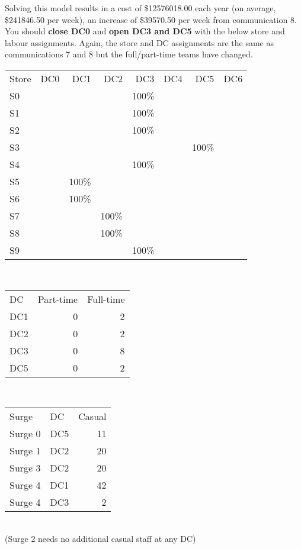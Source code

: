 \documentclass[11pt,a4paper]{article}
\begin{document}
Solving this model results in a cost of \$12576018.00 each year 
(on average, \$241846.50 per week), an increase of \$39570.50 
per week from communication 8.
You should \textbf{close DC0} and 
\textbf{open DC3 and DC5} 
with the below store and labour assignments. 
Again, the store and DC assignments are the same as communications 
7 and 8 but the full/part-time teams have changed.\\[0.8em]
\begin{tabular}{l  r  r  r  r r r r}
    Store & DC0 & DC1 & DC2 & DC3 & DC4 & DC5 & DC6 \\
    S0 &  &  &  & 100\% &  &  &  \\
    S1 &  &  &  & 100\% &  &  &  \\
    S2 &  &  &  & 100\% &  &  &  \\
    S3 &  &  &  &  &  & 100\% &  \\
    S4 &  &  &  & 100\% &  &  &  \\
    S5 &  & 100\% &  &  &  &  &  \\
    S6 &  & 100\% &  &  &  &  &  \\
    S7 &  &  & 100\% &  &  &  &  \\
    S8 &  &  & 100\% &  &  &  &  \\
    S9 &  &  &  & 100\% &  &  &  \\
\end{tabular} \\ [0.8em]
\begin{tabular}{l  r  r }
    DC & Part-time & Full-time \\
    DC1 & 0 &2 \\ 
    DC2  & 0 &2 \\ 
    DC3 &  0& 8 \\
    DC5 &  0&2 \\ 
\end{tabular} \\ [0.8em]
\begin{tabular}{l  l  r }
    Surge & DC & Casual \\
    Surge 0 &DC5& 11  \\ 
    Surge 1&DC2 & 20 \\ 
    Surge 3&DC2 & 20 \\
    Surge 4&DC1 & 42 \\ 
    Surge 4&DC3 & 2 \\ 
\end{tabular} \\ (Surge 2 needs no additional casual staff at any DC)
\end{document}
